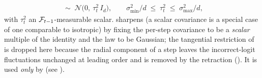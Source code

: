 \begin{assumption}
\begin{enumerate}[label=(\arabic*),leftmargin=2em,itemsep=0.2em]
\begin{align}
          \;\sim\; \mathcal N\!\bigl(0,\ \tau_t^2\,I_d\bigr),
          \qquad
          \sigma_{\min}^2/d \;\le\; \tau_t^2 \;\le\; \sigma_{\max}^2/d,
       \end{align}
       with $\tau_t^2$ an $\mathcal{F}_{t-1}$-measurable scalar.
        sharpens  (a scalar
       covariance is a special case of one comparable to isotropic) by
       fixing the per-step covariance to be a \emph{scalar} multiple of the
       identity and the law to be Gaussian; the tangential restriction of
        is dropped here because the radial component
       of a step leaves the incorrect-logit fluctuations unchanged at
       leading order and is removed by the retraction
       (). It is used \emph{only} by
        (see ).
\end{enumerate}
\end{assumption}

